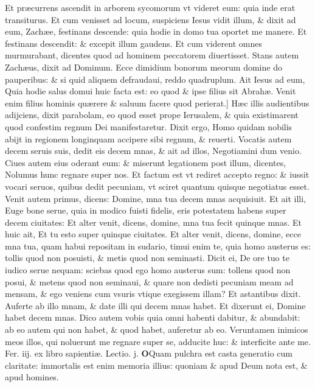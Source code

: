 \documentclass[a5paper,10pt]{book}
\def\leftmarginnote{%
	\lrmarginnote{\hskip -\marginparsep \hskip -6.5em}}
\def\rightmarginnote{%
	\lrmarginnote{\hskip\columnwidth \hskip -1em}}
\def\ae{æ}
\begin{document}
\begin{multicols*}{2}
Et pr\ae currens ascendit in arborem sycomorum vt videret eum: quia inde erat transiturus. Et cum venisset ad locum, suspiciens Iesus vidit illum, \& dixit ad eum, Zach\ae e, festinans descende: quia hodie in domo tua oportet me manere.
Et festinans descendit: \& excepit illum gaudens. Et cum viderent omnes murmurabant, dicentes quod ad hominem peccatorem diuertisset.
Stans autem Zach\ae us, dixit ad Dominum. Ecce dimidium bonorum meorum domine do pauperibus: \& si quid aliquem defraudaui, reddo quadruplum.
Ait
Iesus ad eum, Quia hodie salus domui huic facta est: eo quod \& ipse filius sit Abrah\ae . Venit enim filius hominis qu\ae rere \& saluum facere quod perierat.]
H\ae c\rightmarginnote{B} illis audientibus adijciens, dixit parabolam, eo quod esset prope Ierusalem, \& quia existimarent quod confestim regnum Dei manifestaretur.
Dixit ergo, Homo quidam nobilis abijt in regionem longinquam accipere sibi regnum, \& reuerti.
Vocatis autem decem seruis suis, dedit eis decem mnas, \& ait ad illos, Negotiamini dum venio. Ciues autem eius oderant eum: \& miserunt legationem post illum, dicentes, Nolumus hunc regnare super nos.
Et factum est vt rediret accepto regno: \& iussit vocari seruos, quibus dedit pecuniam, vt sciret quantum quisque negotiatus esset.
Venit autem primus, dicens: Domine, mna tua decem mnas acquisiuit. Et ait illi, Euge bone serue, quia in modico fuisti fidelis, eris potestatem habens super decem ciuitates: Et alter venit, dicens, domine, mna tua fecit quinque mnas.
Et huic ait, Et tu esto super quinque ciuitates. Et alter venit, dicens, domine, ecce mna tua, quam habui repositam in sudario, timui enim te, quia homo austerus es: tollis quod non posuisti, \& metis quod non seminasti.
Dicit ei, De ore tuo te iudico serue nequam: sciebas quod ego homo austerus sum: tollens quod non posui, \& metens quod non seminaui, \& quare non dedisti pecuniam meam ad mensam, \& ego veniens cum vsuris vtique exegissem illam?
Et astantibus dixit. Auferte ab illo mnam, \& date illi qui decem mnas habet. Et dixerunt ei, Domine habet decem mnas.
Dico autem vobis quia omni habenti dabitur, \& abundabit: ab eo autem qui non habet, \& quod habet, auferetur ab eo.
Veruntamen inimicos meos illos, qui noluerunt me regnare super se, adducite huc: \& interficite ante me.
\newline {} \color{red} \hypertarget{TUE-TERTIA-POST-ADV}{Fer. iij.} ex libro sapienti\ae . Lectio. j. \color{black}
\vspace{-2.25em}
\lettrine[lines=2]{\bfseries O}{}Quam\leftmarginnote{\begin{flushright}ca. 4.\end{flushright}} pulchra est casta generatio cum claritate: immortalis est enim memoria illius: quoniam \& apud Deum nota est, \& apud homines.

\end{multicols*}
\end{document}
